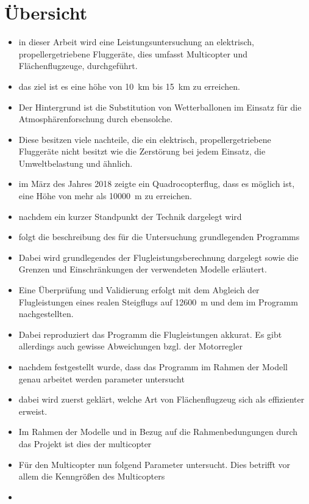\chapter*{Übersicht}
\begin{itemize}
	\item in dieser Arbeit wird eine Leistungsuntersuchung an elektrisch, propellergetriebene Fluggeräte, dies umfasst Multicopter und Flächenflugzeuge, durchgeführt. 
	\item das ziel ist es eine höhe von \SI{10}{km} bis \SI{15}{km} zu erreichen. 
	\item Der Hintergrund ist die Substitution von Wetterballonen im Einsatz für die Atmosphärenforschung durch ebensolche. 
	\item Diese besitzen viele nachteile, die ein elektrisch, propellergetriebene Fluggeräte nicht besitzt wie die Zerstörung bei jedem Einsatz, die Umweltbelastung und ähnlich. 
	\item im März des Jahres 2018 zeigte ein Quadrocopterflug, dass es möglich ist, eine Höhe von mehr als \SI{10000}{m} zu erreichen.
	\item nachdem ein kurzer Standpunkt der Technik dargelegt wird 
	\item folgt die beschreibung des für die Untersuchung grundlegenden Programms
	\item Dabei wird grundlegendes der Flugleistungsberechnung dargelegt sowie die Grenzen und Einschränkungen der verwendeten Modelle erläutert.
	\item Eine Überprüfung und Validierung erfolgt mit dem Abgleich der Flugleistungen eines realen Steigflugs auf \SI{12600}{m} und dem im Programm nachgestellten.
	\item Dabei reproduziert das Programm die Flugleistungen akkurat. Es gibt allerdings auch gewisse Abweichungen bzgl. der Motorregler
	\item nachdem festgestellt wurde, dass das Programm im Rahmen der Modell genau arbeitet werden parameter untersucht
	\item dabei wird zuerst geklärt, welche Art von Flächenflugzeug sich als effizienter erweist. 
	\item Im Rahmen der Modelle und in Bezug auf die Rahmenbedungungen durch das Projekt ist dies der multicopter
	\item Für den Multicopter nun folgend Parameter untersucht. Dies betrifft vor allem die Kenngrößen des Multicopters 
\end{itemize}


\begin{itemize}
	\item 
\end{itemize}